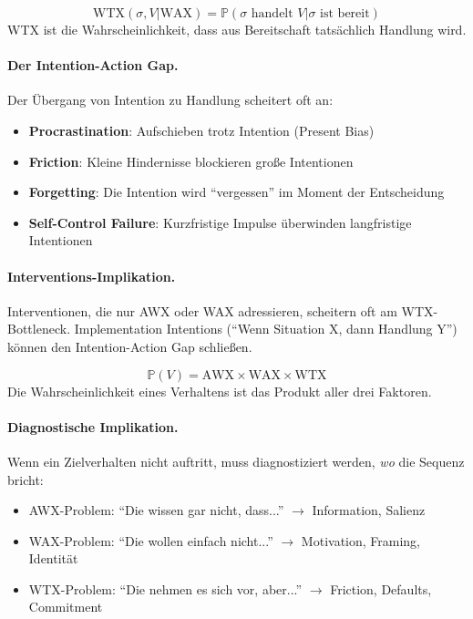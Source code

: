 \begin{axiom}
\begin{equation}
\text{WTX}(\sigma, V | \text{WAX}) = \mathbb{P}(\sigma \text{ handelt } V | \sigma \text{ ist bereit})
\end{equation}
WTX ist die Wahrscheinlichkeit, dass aus Bereitschaft tatsächlich Handlung wird.

\paragraph{Der Intention-Action Gap.}
Der Übergang von Intention zu Handlung scheitert oft an:
\begin{itemize}
    \item \textbf{Procrastination}: Aufschieben trotz Intention (Present Bias)
    \item \textbf{Friction}: Kleine Hindernisse blockieren große Intentionen
    \item \textbf{Forgetting}: Die Intention wird ``vergessen'' im Moment der Entscheidung
    \item \textbf{Self-Control Failure}: Kurzfristige Impulse überwinden langfristige Intentionen
\end{itemize}

\paragraph{Interventions-Implikation.}
Interventionen, die nur AWX oder WAX adressieren, scheitern oft am WTX-Bottleneck. Implementation Intentions (``Wenn Situation X, dann Handlung Y'') können den Intention-Action Gap schließen.
\end{axiom}

\begin{axiom}
\begin{equation}
\mathbb{P}(V) = \text{AWX} \times \text{WAX} \times \text{WTX}
\end{equation}
Die Wahrscheinlichkeit eines Verhaltens ist das Produkt aller drei Faktoren.

\paragraph{Diagnostische Implikation.}
Wenn ein Zielverhalten nicht auftritt, muss diagnostiziert werden, \textit{wo} die Sequenz bricht:
\begin{itemize}
    \item AWX-Problem: ``Die wissen gar nicht, dass...'' $\rightarrow$ Information, Salienz
    \item WAX-Problem: ``Die wollen einfach nicht...'' $\rightarrow$ Motivation, Framing, Identität
    \item WTX-Problem: ``Die nehmen es sich vor, aber...'' $\rightarrow$ Friction, Defaults, Commitment
\end{itemize}
\end{axiom}

